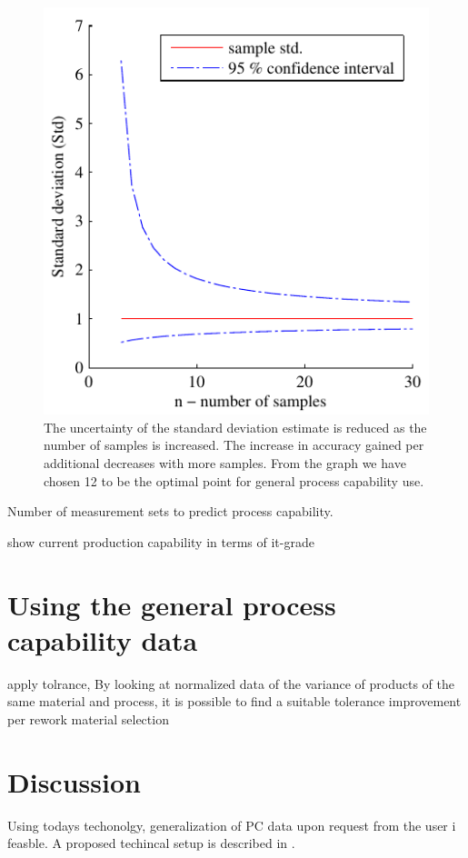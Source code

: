 \documentclass[aip,amsmath, reprint, author-year]{revtex4-1}
\begin{document}
\begin{figure}
\includegraphics{stats_std_confidence.pdf}
\caption{\label{fig:std_uncertainty}The uncertainty of the standard deviation estimate is reduced as the number of samples is increased. The increase in accuracy gained per additional decreases with more samples. From the graph we have chosen 12 to be the optimal point for general process capability use.}
\end{figure}

Number of measurement sets to predict process capability.  


show current production capability in terms of it-grade

\section{Using the general process capability data}
apply tolrance, By looking at normalized data of the variance of products of the same material and process, it is possible to find a suitable tolerance
improvement per rework
material selection


\section{Discussion}

Using todays techonolgy, generalization of PC data upon request from the user i feasble. A proposed techincal setup is described in \cite{OkholmRask}.
\end{document}
